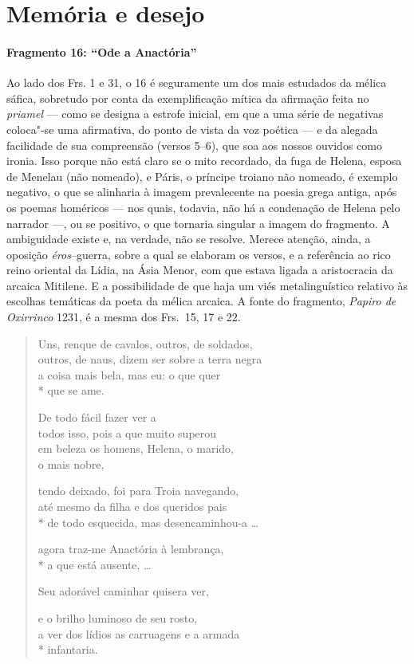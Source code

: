 \section{Memória e desejo}

\paragraph{Fragmento 16: ``Ode a Anactória''}

{\small Ao lado dos Frs. 1 e 31, o 16 é seguramente um dos mais estudados da mélica
sáfica, sobretudo por conta da exemplificação mítica da afirmação feita no
\textit{priamel} --- como se designa a estrofe inicial, em que a uma série de
negativas coloca"-se uma afirmativa, do ponto de vista da voz poética --- e da
alegada facilidade de sua compreensão (versos 5--6), que soa aos nossos ouvidos
como ironia. Isso porque não está claro se o mito recordado, da fuga de Helena, esposa 
de Menelau (não nomeado), e Páris, o príncipe troiano não nomeado, é exemplo
negativo, o que se alinharia à imagem prevalecente na poesia grega antiga, após
os poemas homéricos --- nos quais, todavia, não há a condenação de Helena pelo
narrador ---, ou se positivo, o que tornaria singular a imagem do fragmento. A
ambiguidade existe e, na verdade, não se resolve. Merece atenção, ainda, a
oposição \textit{éros}--guerra, sobre a qual se elaboram os versos, e a
referência ao rico reino oriental da Lídia, na Ásia Menor, com que estava
ligada a aristocracia da arcaica Mitilene. E a possibilidade de que haja um
viés metalinguístico relativo às escolhas temáticas da poeta da mélica arcaica.
A fonte do fragmento, \textit{Papiro de Oxirrinco} 1231, é a mesma dos Frs.~15, 17 e 22.}

\begin{verse}
Uns, renque de cavalos, outros, de soldados,\\
outros, de naus, dizem ser sobre a terra negra\\
a coisa mais bela, mas eu: o que quer\\*
que se ame.

De todo fácil fazer ver a\\
todos isso, pois a que muito superou\\			%
em beleza os homens, Helena, o marido, \\
o mais nobre,

tendo deixado, foi para Troia navegando,\\
até mesmo da filha e dos queridos pais\\*
de todo esquecida, mas desencaminhou-a \ldots{}

agora traz-me Anactória à lembrança,\\*
a que está ausente, \ldots{}

Seu adorável caminhar quisera ver,

e o brilho luminoso de seu rosto,\\
a ver dos lídios as carruagens e a armada\\*
infantaria.
\end{verse}



